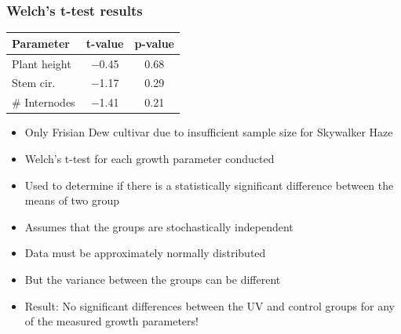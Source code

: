\documentclass[
    12pt,
    aspectratio=1610,
    bibliography=../bibliography.bib,
    link-citations]{beamer}
\begin{document}
    \begin{frame}
        \frametitle{Welch's t-test results}
        \footnotesize
        \begin{table}
            \begin{tabular}{lcc}
                \hline
                \hline
                \textbf{Parameter} & \textbf{t-value} & \textbf{p-value} \\
                \hline
                \hline
                Plant height & \num[mode=text]{-0.45} & \num[mode=text]{0.68} \\
                Stem cir. & \num[mode=text]{-1.17} & \num[mode=text]{0.29} \\
                \# Internodes & \num[mode=text]{-1.41} & \num[mode=text]{0.21} \\
                \hline
                \hline
            \end{tabular}
        \end{table}
        \begin{itemize}
            \item Only Frisian Dew cultivar due to insufficient sample size for Skywalker Haze
            \item Welch's t-test for each growth parameter conducted
            \item Used to determine if there is a statistically significant difference between the means of two group
            \item Assumes that the groups are stochastically independent
            \item Data must be approximately normally distributed
            \item But the variance between the groups can be different
            \item Result: No significant differences between the UV and control groups for any of the measured growth parameters!
        \end{itemize}
    \end{frame}
\end{document}

